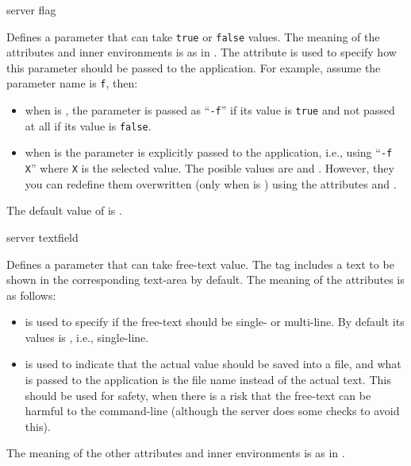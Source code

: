 \bigskip
\xmlstruct
{server}
{flag}
{%
%
  Defines a parameter that can take \texttt{true} or \texttt{false}
  values. The meaning of the attributes and inner environments is as
  in .  The attribute
   is used to specify how this parameter
  should be passed to the application. For example, assume the
  parameter name is \texttt{f}, then:
  \begin{itemize}
  \item when  is , the
    parameter is passed as ``\texttt{-f}'' if its value is
    \texttt{true} and not passed at all if its value is
    \texttt{false}.

  \item when  is  the
    parameter is explicitly passed to the application, i.e., using
    ``\texttt{-f X}'' where \texttt{X} is the selected value. The
    posible values are  and
    . However, they you can redefine them
    overwritten (only when  is
    ) using the attributes
     and .
  \end{itemize}
%
  The default value of  is
  .
%
}


\bigskip
\xmlstruct
{server}
{textfield}
{%
%
  Defines a parameter that can take free-text value.  The
   tag includes a text to be shown in the
  corresponding text-area by default.  The meaning of the attributes
  is as follows:
%
\begin{itemize}
%
\item {} is used to specify if the free-text
  should be single- or multi-line. By default its values is
  , i.e., single-line.
%
\item {} is used to indicate that the actual
  value should be saved into a file, and what is passed to the
  application is the file name instead of the actual text. 
  This should be used for safety, when there is a risk that the
  free-text can be harmful to the command-line (although the server
  does some checks to avoid this).
%
\end{itemize}
%
The meaning of the other attributes and inner environments is as in
.
%
}


